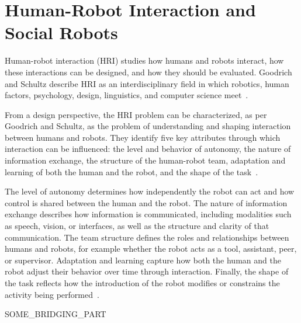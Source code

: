 \section{Human-Robot Interaction and Social Robots}\label{sec:hri-social-robots}

Human-robot interaction (HRI) studies how humans and robots interact, how these interactions can be designed, and how they should be evaluated. Goodrich and Schultz describe HRI as an interdisciplinary field in which robotics, human factors, psychology, design, linguistics, and computer science meet~\cite[203--216]{goodrich_human-robot_2007}.

From a design perspective, the HRI problem can be characterized, as per Goodrich and Schultz, as the problem of understanding and shaping interaction between humans and robots. They identify five key attributes through which interaction can be influenced: the level and behavior of autonomy, the nature of information exchange, the structure of the human-robot team, adaptation and learning of both the human and the robot, and the shape of the task~\cite[216--217]{goodrich_human-robot_2007}.


The level of autonomy determines how independently the robot can act and how control is shared between the human and the robot. The nature of information exchange describes how information is communicated, including modalities such as speech, vision, or interfaces, as well as the structure and clarity of that communication. The team structure defines the roles and relationships between humans and robots, for example whether the robot acts as a tool, assistant, peer, or supervisor. Adaptation and learning capture how both the human and the robot adjust their behavior over time through interaction. Finally, the shape of the task reflects how the introduction of the robot modifies or constrains the activity being performed~\cite[216--232]{goodrich_human-robot_2007}.



SOME\_BRIDGING\_PART

